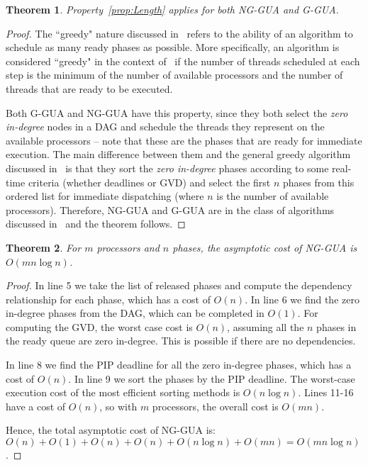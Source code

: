 \documentclass[12pt,dvips]{report}
\newtheorem{thm}{Theorem}
\begin{document}
\begin{thm} Property~\ref{prop:Length} applies for both NG-GUA and G-GUA.
\end{thm}

\begin{proof} The ``greedy" nature discussed in~\cite{ArtOfMpP} refers to the ability of an algorithm to schedule as many ready phases as possible. More specifically, an algorithm is considered ``greedy" in the context of~\cite{ArtOfMpP} if the number of threads scheduled at each step is the minimum of the number of available processors and the number of threads that are ready to be executed.

Both G-GUA and NG-GUA have this property, since they both select the \textit{zero in-degree} nodes in a DAG and schedule the threads they represent on the available processors -- note that these are the phases that are ready for immediate execution. The main difference between them and the general greedy algorithm discussed in~\cite{ArtOfMpP} is that they sort the \textit{zero in-degree} phases according to some real-time criteria (whether deadlines or GVD) and select the first $n$ phases from this ordered list for immediate dispatching (where $n$ is the number of available processors). Therefore, NG-GUA and G-GUA are in the class of algorithms discussed in~\cite{ArtOfMpP} and the theorem follows.
\end{proof}

\begin{thm} For $m$ processors and $n$ phases, the asymptotic cost of NG-GUA is $O(mn \log n)$.
\end{thm}

\begin{proof} In line 5 we take the list of released phases and compute the dependency relationship for each phase, which has a cost of $O(n)$. In line 6 we find the zero in-degree phases from the DAG, which can be completed in $O(1)$. For computing the GVD, the worst case cost is $O(n)$, assuming all the $n$ phases in the ready queue are zero in-degree. This is possible if there are no dependencies. 

In line 8 we find the PIP deadline for all the zero in-degree phases, which has a cost of $O(n)$. In line 9 we sort the phases by the PIP deadline. The worst-case execution cost of the most efficient sorting methods is $O(n \log n)$. Lines 11-16 have a cost of $O(n)$, so with $m$ processors, the overall cost is $O(mn)$.

Hence, the total asymptotic cost of NG-GUA is: $O(n) + O(1) + O(n) + O(n) + O(n \log n) + O(mn) = O(mn\log n)$.
\end{proof}
\end{document}
